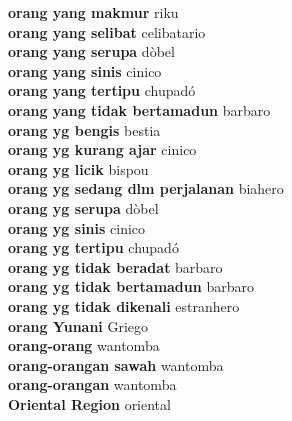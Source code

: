 \textbf{ orang yang makmur  } riku \\
\textbf{ orang yang selibat  } celibatario \\
\textbf{ orang yang serupa  } dòbel \\
\textbf{ orang yang sinis  } cinico \\
\textbf{ orang yang tertipu  } chupadó \\
\textbf{ orang yang tidak bertamadun  } barbaro \\
\textbf{ orang yg bengis  } bestia \\
\textbf{ orang yg kurang ajar  } cinico \\
\textbf{ orang yg licik  } bispou \\
\textbf{ orang yg sedang dlm perjalanan  } biahero \\
\textbf{ orang yg serupa  } dòbel \\
\textbf{ orang yg sinis  } cinico \\
\textbf{ orang yg tertipu  } chupadó \\
\textbf{ orang yg tidak beradat  } barbaro \\
\textbf{ orang yg tidak bertamadun  } barbaro \\
\textbf{ orang yg tidak dikenali  } estranhero \\
\textbf{ orang Yunani  } Griego \\
\textbf{ orang-orang  } wantomba \\
\textbf{ orang-orangan sawah  } wantomba \\
\textbf{ orang-orangan  } wantomba \\
\textbf{ Oriental Region  } oriental \\
